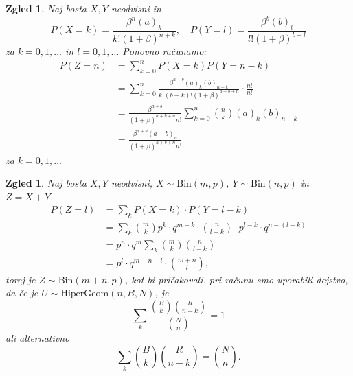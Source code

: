 \documentclass[10pt, a4paper]{article}
\newtheorem{zgled}[izr]{Zgled}
\begin{document}
\begin{zgled}
  Naj bosta $X, Y$ neodvisni in 
  $$P(X = k) = \frac{\beta^n (a)_k}{k! (1 + \beta)^{n + k}},\quad P(Y = l) = \frac{\beta^b (b)_l}{l! (1 + \beta)^{b + l}}$$
  za $k = 0, 1, \dots$ in $l = 0, 1, \dots$ Ponovno računamo:
  \begin{align*}
    P(Z = n) &= \sum_{k = 0} ^n P(X = k) P(Y = n - k)\\
    &= \sum_{k = 0} ^n \frac{\beta^{a + b} (a)_k (b)_{n - k}}{k! (b - k)! (1 + \beta)^{a + b + n}} \cdot \frac{n!}{n!}\\
    &= \frac{\beta^{a + b}}{(1 + \beta)^{a + b + n} n!} \sum_{k = 0} ^n \binom{n}{k} (a)_k (b)_{n - k}\\
    &= \frac{\beta^{a + b} (a + b)_n}{(1 + \beta)^{a + b + n} n!} 
  \end{align*}
  za $k = 0, 1, \dots$
\end{zgled}

\begin{zgled}
  Naj bosta $X, Y$ neodvisni, $X \sim \mathrm{Bin} (m, p)$, $Y \sim \mathrm{Bin} (n, p)$ in $Z = X + Y$.
  \begin{align*}
    P(Z = l) &= \sum_{k} P(X = k) \cdot P(Y = l - k)\\
    &= \sum_k \binom{m}{k} p^k \cdot q^{m - k} \cdot \binom{n}{l - k} \cdot p^{l - k} \cdot q^{n - (l - k)}\\
    &= p^n \cdot q^m \sum_k \binom{m}{k} \binom{n}{l - k}\\
    &= p^l \cdot q^{m + n - l} \cdot \binom{m + n}{l},
  \end{align*}
  torej je $Z \sim \mathrm{Bin} (m + n, p)$, kot bi pričakovali.
  pri računu smo uporabili dejstvo, da če je $U \sim \mathrm{HiperGeom}(n, B, N)$,
  je $$\sum_k \frac{\binom{B}{k} \binom{R}{n - k}}{\binom{N}{n}} = 1$$
  ali alternativno 
  $$\sum_k \binom{B}{k} \binom{R}{n - k} = \binom{N}{n}.$$
\end{zgled}
\end{document}
